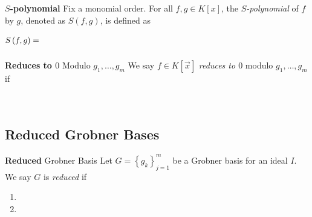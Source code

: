 \documentclass[11pt]{article}
\begin{document}
    \begin{definition}{\textbf{$S$-polynomial}}
        Fix a monomial order. For all $f,g\in K\left[ x \right]$, the \emph{$S$-polynomial} of $f$ by $g$, denoted as $S\left( f,g \right)$, is defined as
        \begin{equation*}
            S\left( f,g \right) = \phantom{\frac{\lcm\left( \initial\left( f \right),\initial\left( g \right) \right)}{c\initial\left( f \right)} f - \frac{\lcm\left( \initial\left( f \right),\initial\left( g \right) \right)}{d\initial\left( g \right)}g}
        \end{equation*}
    \end{definition}
    
    \begin{definition}{\textbf{Reduces to $0$} Modulo $g_1,\ldots,g_m$}
        We say $f\in K\left[ \vec{x} \right]$ \emph{reduces to $0$} modulo $g_1,\ldots,g_m$ if
        \begin{equation*}
            \phantom{f = \sum^{m}_{i=1} q_ig_i}
        \end{equation*}
    \end{definition}

    \subsection{Reduced Grobner Bases}
    
    \begin{definition}{\textbf{Reduced} Grobner Basis}
        Let $G = \left\lbrace g_k \right\rbrace^{m}_{j=1}$ be a Grobner basis for an ideal $I$. We say $G$ is \emph{reduced} if
        \begin{enumerate}
            \item 
            \item 
        \end{enumerate}
    \end{definition} 
    
\end{document}
